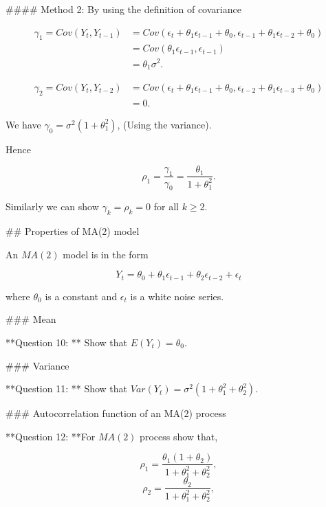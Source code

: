 \documentclass[11pt,a4paper,]{article}
\begin{document}
{#### Method 2: By using the definition of covariance


\begin{equation}
  \label{eq:mtd21}
\begin{aligned}
\gamma_1 = Cov(Y_t, Y_{t-1}) &= Cov(\epsilon_t + \theta_1 \epsilon_{t-1}+ \theta_0, \epsilon_{t-1}+\theta_1 \epsilon_{t-2} + \theta_0)\\
&=Cov(\theta_1 \epsilon_{t-1}, \epsilon_{t-1})\\
&=\theta_1 \sigma^2.
\end{aligned}
\end{equation}


\begin{equation}
  \label{eq:mtd21}
\begin{aligned}
\gamma_2=Cov(Y_t, Y_{t-2}) &= Cov(\epsilon_t + \theta_1 \epsilon_{t-1}+ \theta_0, \epsilon_{t-2}+\theta_1 \epsilon_{t-3} + \theta_0)\\
&=0.
\end{aligned}
\end{equation}

We have $\gamma_0=\sigma^2(1+\theta_1^2)$, (Using the variance).

Hence

$$\rho_1=\frac{\gamma_1}{\gamma_0}=\frac{\theta_1}{1+\theta_1^2}.$$

Similarly we can show $\gamma_k=\rho_k=0$ for all $k \geq 2$.

## Properties of MA(2) model

An $MA(2)$ model is in the form

\begin{equation}
  \label{eq:ma2}
Y_t = \theta_0 + \theta_1 \epsilon_{t-1} + \theta_2 \epsilon_{t-2} + \epsilon_t
\end{equation}

where $\theta_0$ is a constant and ${\epsilon_t}$ is a white noise series.

### Mean

**Question 10: ** Show that $E(Y_t) = \theta_0.$

### Variance

**Question 11: ** Show that $Var(Y_t) = \sigma^2 (1+\theta_1^2 + \theta_2^2).$

### Autocorrelation function of an MA(2) process

**Question 12: **For $MA(2)$ process show that,

$$\rho_1=\frac{\theta_1(1+\theta_2)}{1+\theta_1^2+\theta_2^2},$$
$$\rho_2 = \frac{\theta_2}{1+\theta_1^2 + \theta_2^2},$$

}
\end{document}
